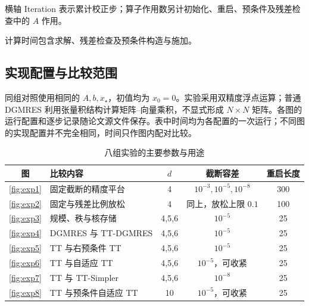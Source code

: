 横轴 Iteration 表示累计校正步；算子作用数另计初始化、重启、预条件及残差检查中的 $A$ 作用。

计算时间包含求解、残差检查及预条件构造与施加。

\subsection{实现配置与比较范围}

同组对照使用相同的 $A,b,x_\star$，初值均为 $x_0=0$。实验采用双精度浮点运算；普通 DGMRES 利用张量积结构计算矩阵--向量乘积，不显式形成 $N\times N$ 矩阵。各图的运行配置和逐步记录随论文源文件保存。表中时间均为各配置的一次运行；不同图的实现配置并不完全相同，时间只作图内配对比较。

\begin{table}[H]
\centering\small
\caption{八组实验的主要参数与用途}\label{tab:exp-config}
\setlength{\tabcolsep}{4pt}
\begin{tabular}{clccc}
\toprule
图 & 比较内容 & $d$ & 截断容差 & 重启长度\\
\midrule
\ref{fig:exp1}&固定截断的精度平台&4&$10^{-3},10^{-5},10^{-8}$&300\\
\ref{fig:exp2}&固定与残差比例放松&4&同上，放松上限 $0.1$&100\\
\ref{fig:exp3}&规模、秩与核存储&4,5,6&$10^{-5}$&25\\
\ref{fig:exp4}&DGMRES 与 TT-DGMRES&4,5,6&$10^{-5}$&25\\
\ref{fig:exp5}&TT 与右预条件 TT&4,5,6&$10^{-5}$&25\\
\ref{fig:exp6}&TT 与自适应 TT&4,5,6&$10^{-5}$，可收紧&25\\
\ref{fig:exp7}&TT 与 TT-Simpler&4,5,6&$10^{-8}$&25\\
\ref{fig:exp8}&TT 与预条件自适应 TT&10&$10^{-5}$，可收紧&25\\
\bottomrule
\end{tabular}
\end{table}
